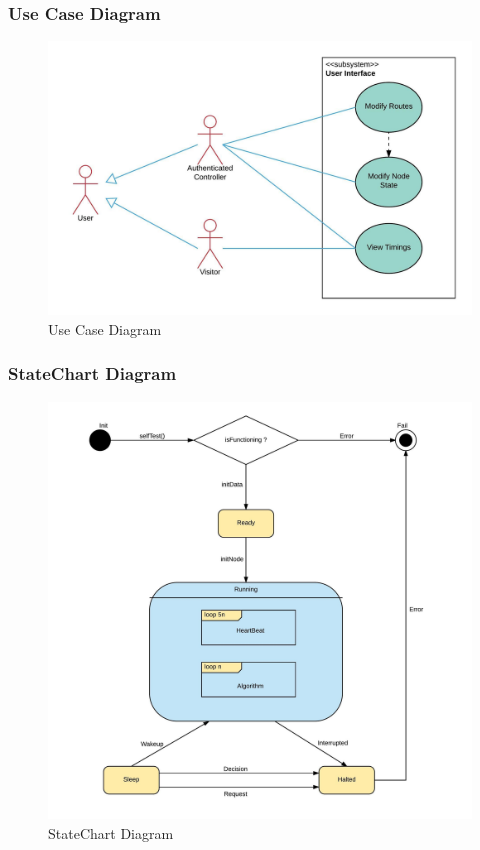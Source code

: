 \documentclass[12pt,a4paper,final]{report}
\begin{document}
\subsubsection{Use Case Diagram}
	\begin{figure}[!h]
		\begin{center}
			\includegraphics[scale=0.2]{Diagrams/Old Diagrams/Use_Case_Diagram.jpeg}
		\end{center}
		\caption{Use Case Diagram}
	\end{figure}
	
\subsubsection{StateChart Diagram}
	\begin{figure}[!h]
		\begin{center}
			\includegraphics[scale=0.12]{Diagrams/Old Diagrams/StateChart_Diagram.jpeg}
		\end{center}
		\caption{StateChart Diagram}
	\end{figure}
\end{document}
